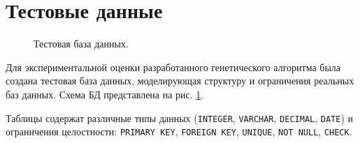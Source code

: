 \documentclass[master,paper]{pmk-graduate}
\begin{document}
\section{Тестовые данные}
\label{sec31}

\begin{figure}
	\centering
	\caption{Тестовая база данных.}
	\label{fig2}
\end{figure}

Для экспериментальной оценки разработанного генетического алгоритма была создана тестовая база данных, моделирующая структуру и ограничения реальных баз данных. Схема БД представлена на рис. \ref{fig2}.

Таблицы содержат различные типы данных (\texttt{INTEGER}, \texttt{VARCHAR}, \texttt{DECIMAL}, \texttt{DATE}) и ограничения целостности: \texttt{PRIMARY KEY}, \texttt{FOREIGN KEY}, \texttt{UNIQUE}, \texttt{NOT NULL}, \texttt{CHECK}.
\end{document}
